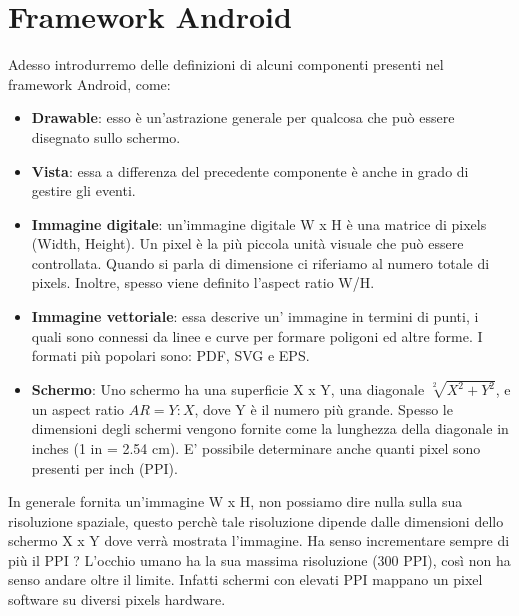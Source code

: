 \chapter{Framework Android}
Adesso introdurremo delle definizioni di alcuni componenti presenti nel framework Android, come:
\begin{itemize}
\item \textbf{Drawable}: esso è un'astrazione generale per qualcosa che può essere disegnato sullo schermo.
\item \textbf{Vista}: essa a differenza del precedente componente è anche in grado di gestire gli eventi.
\item \textbf{Immagine digitale}: un'immagine digitale W x H è una matrice di pixels (Width, Height). Un pixel è la più piccola unità visuale che può essere controllata. Quando si parla di dimensione ci riferiamo al numero totale di pixels. Inoltre, spesso viene definito l'aspect ratio W/H.
\item \textbf{Immagine vettoriale}: essa descrive un' immagine in termini di punti, i quali sono connessi da linee e curve per formare poligoni ed altre forme. I formati più popolari sono: PDF, SVG e EPS.
\item \textbf{Schermo}: Uno schermo ha una superficie X x Y, una diagonale $\sqrt[2]{X^2 + Y^2}$, e un aspect ratio $AR = Y:X$, dove Y è il numero più grande. Spesso le dimensioni degli schermi vengono fornite come la lunghezza della diagonale in inches (1 in = 2.54 cm). E' possibile determinare anche quanti pixel sono presenti per inch (PPI).
\end{itemize}
In generale fornita un'immagine W x H, non possiamo dire nulla sulla sua risoluzione spaziale, questo perchè tale risoluzione dipende dalle dimensioni dello schermo X x Y dove verrà mostrata l'immagine. Ha senso incrementare sempre di più il PPI ? L'occhio umano ha la sua massima risoluzione (300 PPI), così non ha senso andare oltre il limite. Infatti schermi con elevati PPI mappano un pixel software su diversi pixels hardware.
